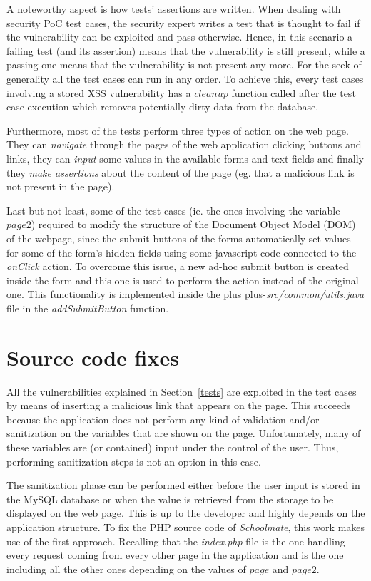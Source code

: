 \documentclass{sig-alternate-05-2015}
\newcommand\lword[1]{\leavevmode\nobreak\hskip0pt plus\linewidth\penalty50\hskip0pt plus-\linewidth\nobreak#1}
\begin{document}
A noteworthy aspect is how tests' assertions are written. When dealing with
security PoC test cases, the security expert writes a test that is thought to fail
if the vulnerability can be exploited and pass otherwise. Hence, in this scenario
a failing test (and its assertion) means that the vulnerability is still present,
while a passing one means that the vulnerability is not present any more.
For the seek of generality all the test cases can run in any order. To achieve this,
every test cases involving a stored XSS vulnerability has a $cleanup$ function called
after the test case execution which removes potentially dirty data from the database.

Furthermore, most of the tests perform three types of action on the web page.
They can \emph{navigate} through the pages of the web application clicking buttons and links,
they can \emph{input} some values in the available forms and text fields and finally they
\emph{make assertions} about the content of the page (eg. that a malicious link is not
present in the page).

Last but not least, some of the test cases (ie. the ones involving the variable $page2$)
required to modify the structure of the Document Object Model (DOM) of the webpage, since
the submit buttons of the forms automatically set values for some of the form's hidden
fields using some javascript code connected to the \emph{onClick} action.
To overcome this issue, a new ad-hoc submit button is created inside the form
and this one is used to perform the action instead of the original one. This functionality
is implemented inside the \lword{\emph{src/common/utils.java}} file in the \emph{addSubmitButton}
function.


\section{Source code fixes}\label{fixes}
All the vulnerabilities explained in Section~\ref{tests} are exploited in the test cases
by means of inserting a malicious link that appears on the page. This succeeds because
the application does not perform any kind of validation and/or sanitization on the variables
that are shown on the page. Unfortunately, many of these variables are (or contained) input
under the control of the user. Thus, performing sanitization steps is not an option in this
case.

The sanitization phase can be performed either before the user input is stored in the
MySQL database or when the value is retrieved from the storage to be displayed on the
web page. This is up to the developer and highly depends on the application structure.
To fix the PHP source code of \emph{Schoolmate}, this work makes use of the first approach.
Recalling that the \emph{index.php} file is the one handling every request coming from
every other page in the application and is the one including all the other ones depending
on the values of $page$ and $page2$.
\end{document}
